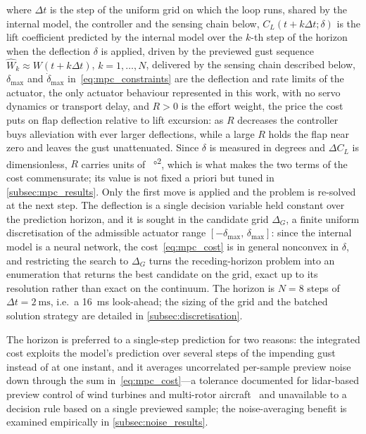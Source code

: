 where $\Delta t$ is the step of the uniform grid on which the loop runs, shared by the internal model, the controller and the sensing chain below, $C_L(t+k\Delta t;\delta)$ is the lift coefficient predicted by the internal model over the $k$-th step of the horizon when the deflection $\delta$ is applied, driven by the previewed gust sequence $\widehat{W}_k \approx W(t+k\Delta t)$, $k=1,\dots,N$, delivered by the sensing chain described below, $\delta_{\max}$ and $\dot\delta_{\max}$ in~\eqref{eq:mpc_constraints} are the deflection and rate limits of the actuator, the only actuator behaviour represented in this work, with no servo dynamics or transport delay, and $R>0$ is the effort weight, the price the cost puts on flap deflection relative to lift excursion: as $R$ decreases the controller buys alleviation with ever larger deflections, while a large $R$ holds the flap near zero and leaves the gust unattenuated. Since $\delta$ is measured in degrees and $\Delta C_L$ is dimensionless, $R$ carries units of \si{\per\degree\squared}, which is what makes the two terms of the cost commensurate; its value is not fixed a priori but tuned in \cref{subsec:mpc_results}. Only the first move is applied and the problem is re-solved at the next step. The deflection is a single decision variable held constant over the prediction horizon, and it is sought in the candidate grid $\Delta_G$, a finite uniform discretisation of the admissible actuator range $[-\delta_{\max},\,\delta_{\max}]$: since the internal model is a neural network, the cost~\eqref{eq:mpc_cost} is in general nonconvex in $\delta$, and restricting the search to $\Delta_G$ turns the receding-horizon problem into an enumeration that returns the best candidate on the grid, exact up to its resolution rather than exact on the continuum. The horizon is $N = 8$ steps of $\Delta t = \SI{2}{\milli\second}$, i.e.\ a \SI{16}{\milli\second} look-ahead; the sizing of the grid and the batched solution strategy are detailed in \cref{subsec:discretisation}.

The horizon is preferred to a single-step prediction for two reasons: the integrated cost exploits the model's prediction over several steps of the impending gust instead of at one instant, and it averages uncorrelated per-sample preview noise down through the sum in~\eqref{eq:mpc_cost}---a tolerance documented for lidar-based preview control of wind turbines and multi-rotor aircraft~\cite{mendez2023mpclidar,sinner2023timing} and unavailable to a decision rule based on a single previewed sample; the noise-averaging benefit is examined empirically in \cref{subsec:noise_results}.

